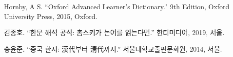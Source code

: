\par Hornby, A S. ``Oxford Advanced Learner's Dictionary." 9th Edition, Oxford University Press, 2015, Oxford.
\par 김종호. ``한문 해석 공식: 촘스키가 논어를 읽는다면.'' 한티미디어, 2019, 서울.
\par 송윤준. ``중국 한시: 漢代부터 淸代까지.'' 서울대학교출판문화원, 2014, 서울.
